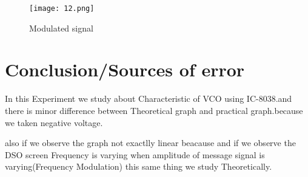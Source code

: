\documentclass{article}
\begin{document}
\begin{figure*}[h]
	\centering
	\texttt{[image: 12.png]}
	\caption{Modulated signal}
	\label{FD}
\end{figure*}








\section{Conclusion/Sources of error}
 In this Experiment we study about Characteristic of VCO using IC-8038.and there is minor difference between Theoretical graph and practical graph.because we taken negative voltage.\par also if we observe the graph not exactlly linear beacause 
 and if we observe the DSO screen Frequency is varying when amplitude of message signal is varying(Frequency Modulation) this same thing we study Theoretically.
 
 
\end{document}
